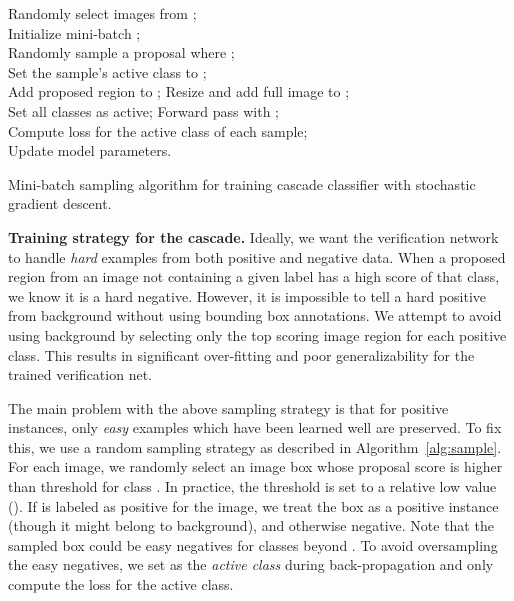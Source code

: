 \documentclass[10pt,twocolumn,letterpaper]{article}
\begin{document}
\begin{algorithm}
    {
      Randomly select  images  from ;\\
      Initialize mini-batch ;\\
      \For{}
      {
         {
         Randomly sample a proposal  where ;\\
         Set the sample's active class to ;\\
         Add proposed region to ;
         }
         \Else
         {
         Resize and add full image to ;\\
         Set all classes as active;
         }
      }
      Forward pass with ;\\
      Compute loss for the active class of each sample;\\
      Update model parameters.\\
    }
\caption{Mini-batch sampling algorithm for training cascade classifier with stochastic gradient descent.}
\label{alg:sample}
\end{algorithm}

\textbf{Training strategy for the cascade.} Ideally, we want the verification network to handle \textit{hard} examples from both positive and negative data. When a proposed region from an image not containing a given label has a high score of that class, we know it is a hard negative. However, it is impossible to tell a hard positive from background without using bounding box annotations. We attempt to avoid using background by selecting only the top scoring image region for each positive class. This results in significant over-fitting and poor generalizability for the trained verification net. 

The main problem with the above sampling strategy is that for positive instances, only \textit{easy} examples which have been learned well are preserved. To fix this, we use a random sampling strategy as described in Algorithm~\ref{alg:sample}. For each image, we randomly select an image box whose proposal score is higher than threshold  for class . In practice, the threshold is set to a relative low value (\eg ). If  is labeled as positive for the image, we treat the box as a positive instance (though it might belong to background), and otherwise negative. Note that the sampled box could be easy negatives for classes beyond . To avoid oversampling the easy negatives, we set  as the \textit{active class} during back-propagation and only compute the loss for the active class.
\end{document}
